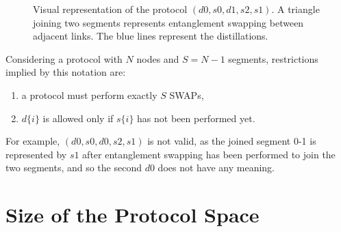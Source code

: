 \documentclass{article}
\begin{document}
\begin{figure}[ht!]
  \centering
  \caption{Visual representation of the protocol $(d0, s0, d1, s2, s1)$. A triangle joining two segments represents entanglement swapping between adjacent links. The blue lines represent the distillations.}
  \label{fig:triangle_notation}
\end{figure}

Considering a protocol with $N$ nodes and $S=N-1$ segments, restrictions implied by this notation are:
\begin{enumerate}
  \item a protocol must perform exactly $S$ SWAPs,
  \item $d\{i\}$ is allowed only if $s\{i\}$ has not been performed yet.
\end{enumerate}

For example, $(d0, s0, d0, s2, s1)$ is not valid, as the joined segment 0-1 is represented by $s1$ after entanglement swapping has been performed to join the two segments, and so the second $d0$ does not have any meaning.

\section*{Size of the Protocol Space}
\end{document}
